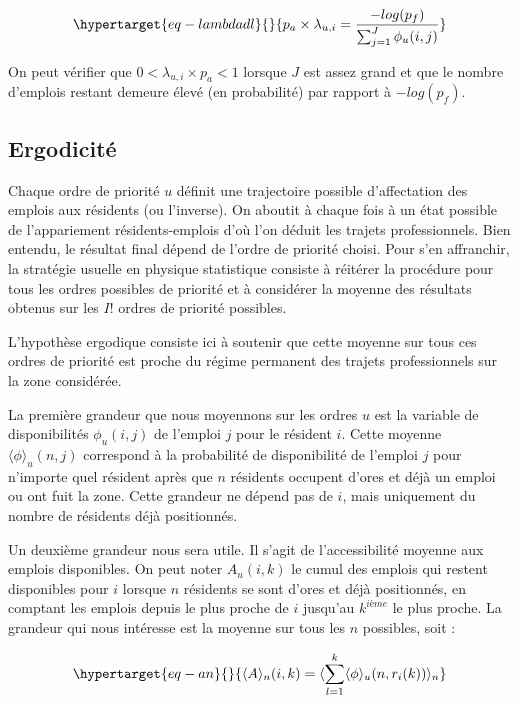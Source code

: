 \documentclass[
  10pt,
  a4paper,
  numbers=noendperiod,
  DIV=9]{scrreprt}
\begin{document}
\begin{equation}\protect\hypertarget{eq-lambdadl}{}{
p_{a} \times \lambda_{u,i} = \frac {-log(p_f)}{\sum_{j=1} ^{J} \phi_u(i,j)}
}\label{eq-lambdadl}\end{equation}

On peut vérifier que \(0<\lambda_{u,i}\times p_a<1\) lorsque \(J\) est
assez grand et que le nombre d'emplois restant demeure élevé (en
probabilité) par rapport à \(-log(p_f)\).

\hypertarget{sec-erg}{%
\subsection{Ergodicité}\label{sec-erg}}

Chaque ordre de priorité \(u\) définit une trajectoire possible
d'affectation des emplois aux résidents (ou l'inverse). On aboutit à
chaque fois à un état possible de l'appariement résidents-emplois d'où
l'on déduit les trajets professionnels. Bien entendu, le résultat final
dépend de l'ordre de priorité choisi. Pour s'en affranchir, la stratégie
usuelle en physique statistique consiste à réitérer la procédure pour
tous les ordres possibles de priorité et à considérer la moyenne des
résultats obtenus sur les \(I!\) ordres de priorité possibles.

L'hypothèse ergodique consiste ici à soutenir que cette moyenne sur tous
ces ordres de priorité est proche du régime permanent des trajets
professionnels sur la zone considérée.

La première grandeur que nous moyennons sur les ordres \(u\) est la
variable de disponibilités \(\phi_u(i,j)\) de l'emploi \(j\) pour le
résident \(i\). Cette moyenne \(\langle\phi\rangle_u(n,j)\) correspond à
la probabilité de disponibilité de l'emploi \(j\) pour n'importe quel
résident après que \(n\) résidents occupent d'ores et déjà un emploi ou
ont fuit la zone. Cette grandeur ne dépend pas de \(i\), mais uniquement
du nombre de résidents déjà positionnés.

Un deuxième grandeur nous sera utile. Il s'agit de l'accessibilité
moyenne aux emplois disponibles. On peut noter \(A_u(i,k)\) le cumul des
emplois qui restent disponibles pour \(i\) lorsque \(n\) résidents se
sont d'ores et déjà positionnés, en comptant les emplois depuis le plus
proche de \(i\) jusqu'au \(k^{ième}\) le plus proche. La grandeur qui
nous intéresse est la moyenne sur tous les \(n\) possibles, soit :

\begin{equation}\protect\hypertarget{eq-an}{}{
\langle A \rangle_n(i,k) = \langle\sum_{l=1}^k \langle \phi \rangle_u(n, r_i(k)) \rangle _n
}\label{eq-an}\end{equation}
\end{document}
